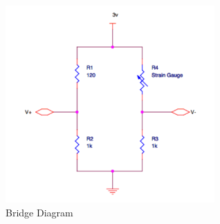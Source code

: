 \begin{figure}
\begin{center}
\includegraphics[width=8cm]{implementation/figures/bridge_diagram}
\end{center}
\caption{Bridge Diagram}
\label{fig:Bridge Diagram}
\end{figure}
